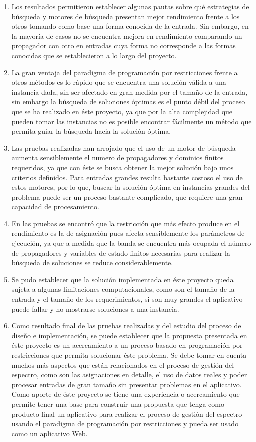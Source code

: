 \begin{enumerate}
	\item Los resultados permitieron establecer algunas pautas sobre qué estrategias de búsqueda y motores de búsqueda presentan mejor rendimiento frente a los otros tomando como base una forma conocida de la entrada. Sin embargo, en la mayoría de casos no se encuentra mejora en rendimiento comparando un propagador con otro en entradas cuya forma no corresponde a las formas conocidas que se establecieron a lo largo del proyecto.
	\item La gran ventaja del paradigma de programación por restricciones frente a otros métodos es lo rápido que se encuentra una solución válida a una instancia dada, sin ser afectado en gran medida por el tamaño de la entrada, sin embargo la búsqueda de soluciones óptimas es el punto débil del proceso que se ha realizado en éste proyecto, ya que por la alta complejidad que pueden tomar las instancias no es posible encontrar fácilmente un método que permita guiar la búsqueda hacia la solución óptima.
	\item Las pruebas realizadas han arrojado que el uso de un motor de búsqueda aumenta sensiblemente el numero de propagadores y dominios finitos requeridos, ya que con éste se busca obtener la mejor solución bajo unos criterios definidos. Para entradas grandes resulta bastante costoso el uso de estos motores, por lo que, buscar la solución óptima en instancias grandes del problema puede ser un proceso bastante complicado, que requiere una gran capacidad de procesamiento.
	\item En las pruebas se encontró que la restricción que más efecto produce en el rendimiento es la de asignación pues afecta sensiblemente los parámetros de ejecución, ya que a medida que la banda se encuentra más ocupada el número de propagadores y variables de estado finitos necesarias para realizar la búsqueda de soluciones se reduce considerablemente.
	\item Se pudo establecer que la solución implementada en éste proyecto queda sujeta a algunas limitaciones computacionales, como son el tamaño de la entrada y el tamaño de los requerimientos, si son muy grandes el aplicativo puede fallar y no mostrarse soluciones a una instancia.
	\item Como resultado final de las pruebas realizadas y del estudio del proceso de diseño e implementación, se puede establecer que la propuesta presentada en éste proyecto es un acercamiento a un proceso basado en programación por restricciones que permita solucionar éste problema. Se debe tomar en cuenta muchos más aspectos que están relacionados en el proceso de gestión del espectro, como son las asignaciones en detalle, el uso de datos reales y poder procesar entradas de gran tamaño sin presentar problemas en el aplicativo. Como aporte de éste proyecto se tiene una experiencia o acercamiento que permite tener una base para construir una propuesta que tenga como producto final un aplicativo para realizar el proceso de gestión del espectro usando el paradigma de programación por restricciones y pueda ser usado como un aplicativo Web.
\end{enumerate}

















